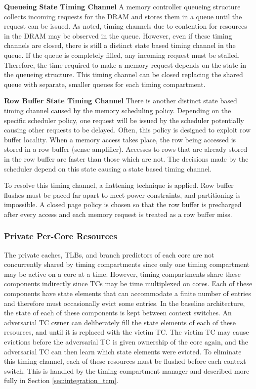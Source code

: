\textbf{Queueing State Timing Channel}
A memory controller queueing structure collects incoming requests for the DRAM 
and stores them in a queue until the request can be issued.  As noted, timing 
channels due to contention for resources in the
DRAM may be observed in the queue. However, even if these timing channels are 
closed, there is still a distinct state based timing channel in the queue.  If 
the queue is completely filled, any incoming request must be stalled.  
Therefore, the time required to make a memory request depends on the state in 
the queueing structure. This timing channel can be closed replacing the shared 
queue with separate, smaller queues for each timing compartment.

\textbf{Row Buffer State Timing Channel}
There is another distinct state based timing channel caused by the memory 
scheduling policy. Depending on the specific scheduler policy, one request will 
be issued by the scheduler potentially causing other requests to be delayed.  
Often, this policy is designed to exploit row buffer locality. When a memory 
access takes place, the row being accessed is stored in a row buffer (sense 
amplifier). Accesses to rows that are already stored in the row buffer are 
faster than those which are not. The decisions made by the scheduler depend on 
this state causing a state based timing channel.

To resolve this timing channel, a flattening technique is applied. Row buffer 
flushes must be paced far apart to meet power constraints, and partitioning is 
impossible. A closed page policy is chosen so that the row buffer is precharged 
after every access and each memory request is treated as a row buffer miss.

\subsubsection{Private Per-Core Resources}

The private caches, TLBs, and branch predictors of each core are not 
concurrently shared by timing compartments since only one timing compartment 
may be active on a core at a time. However, timing compartments share these 
components indirectly since TCs may be time multiplexed on cores.  Each of 
these components have state elements that can accommodate a finite number of 
entries and therefore must occasionally evict some entries. In the baseline 
architecture, the state of each of these components is kept between context 
switches. An adversarial TC owner can deliberately fill the state elements of 
each of these resources, and until it is replaced with the victim TC. The 
victim TC may cause evictions before the adversarial TC is given ownership of 
the core again, and the adversarial TC can then learn which state elements were 
evicted. To eliminate this timing channel, each of these resources must be 
flushed before each context switch. This is handled by the timing compartment 
manager and described more fully in Section \ref{sec:integration_tcm}.

